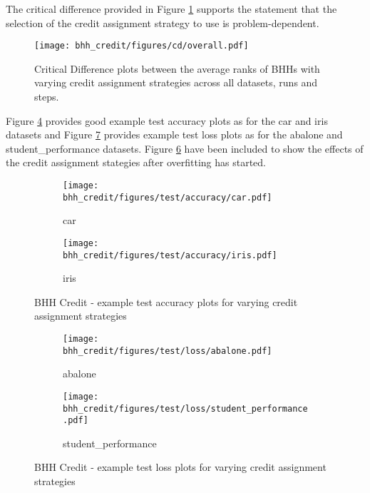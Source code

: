 The critical difference provided in Figure \ref{fig:results:credit:descriptive:cd} supports the statement that the selection of the credit assignment strategy to use is problem-dependent.

\begin{figure}[htbp]
	\centering
	\texttt{[image: bhh\_credit/figures/cd/overall.pdf]}
	\caption{Critical Difference plots between the average ranks of \Acsp{BHH} with varying credit assignment strategies across all datasets, runs and steps.}
	\label{fig:results:credit:descriptive:cd}
\end{figure}

Figure \ref{fig:results:credit:figures:accuracy} provides good example test accuracy plots as for the car and iris datasets and Figure \ref{fig:results:credit:figures:loss} provides example test loss plots as for the abalone and student\_performance datasets. Figure \ref{fig:results:credit:figures:loss2} have been included to show the effects of the credit assignment stategies after overfitting has started.


\begin{figure}[htbp]
	\begin{subfigure}{0.5\textwidth}
		\centering
		\texttt{[image: bhh\_credit/figures/test/accuracy/car.pdf]}
		\caption{car}
		\label{fig:results:credit:figures:accuracy1}
	\end{subfigure}
	\begin{subfigure}{0.5\textwidth}
		\centering
		\texttt{[image: bhh\_credit/figures/test/accuracy/iris.pdf]}
		\caption{iris}
		\label{fig:results:credit:figures:accuracy2}
	\end{subfigure}
	\caption{\Acs{BHH} Credit - example test accuracy plots for varying credit assignment strategies}
	\label{fig:results:credit:figures:accuracy}
\end{figure}


\begin{figure}[htbp]
	\begin{subfigure}{0.5\textwidth}
		\centering
		\texttt{[image: bhh\_credit/figures/test/loss/abalone.pdf]}
		\caption{abalone}
		\label{fig:results:credit:figures:loss1}
	\end{subfigure}
	\begin{subfigure}{0.5\textwidth}
		\centering
		\texttt{[image: bhh\_credit/figures/test/loss/student\_performance.pdf]}
		\caption{student\_performance}
		\label{fig:results:credit:figures:loss2}
	\end{subfigure}
	\caption{\Acs{BHH} Credit - example test loss plots for varying credit assignment strategies}
	\label{fig:results:credit:figures:loss}
\end{figure}


